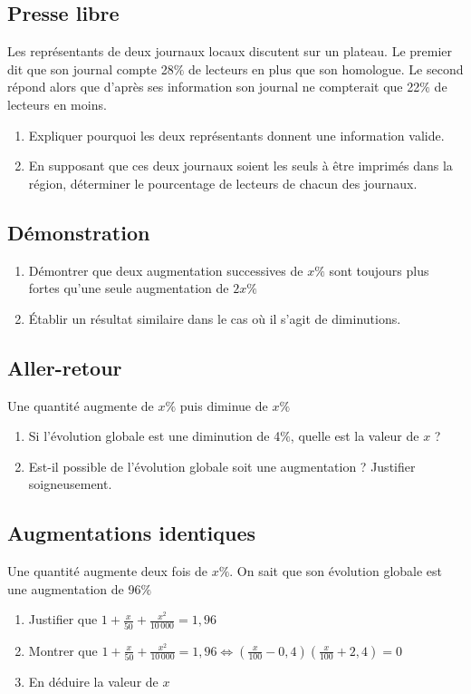 \documentclass[oneside,12pt]{article}          %
\begin{document}
\subsection{Presse libre}
Les représentants de deux journaux locaux discutent sur un plateau. Le premier dit que son journal compte 28$\%$ de lecteurs en plus que son homologue. Le second répond alors que d'après ses information son journal ne compterait que 22$\%$ de lecteurs en moins.
\begin{enumerate}
	\item Expliquer pourquoi les deux représentants donnent une information valide.
	\item En supposant que ces deux journaux soient les seuls à être imprimés dans la région, déterminer le pourcentage de lecteurs de chacun des journaux.
\end{enumerate}



\subsection{Démonstration}
\begin{enumerate}
	\item Démontrer que deux augmentation successives de $x\%$ sont toujours plus fortes qu'une seule augmentation de $2x\%$
	\item Établir un résultat similaire dans le cas où il s'agit de diminutions.
\end{enumerate}


\subsection{Aller-retour}
Une quantité augmente de $x\%$ puis diminue de $x\%$
\begin{enumerate}
    \item Si l'évolution globale est une diminution de 4$\%$, quelle est la valeur de $x$ ?
    \item Est-il possible de l'évolution globale soit une augmentation ? Justifier soigneusement.
\end{enumerate}



\subsection{Augmentations identiques}
Une quantité augmente deux fois de $x\%$. On sait que son évolution globale est une augmentation de 96$\%$
\begin{enumerate}
    \item Justifier que $1+\frac{x}{50}+\frac{x^2}{10\,000}=1,96$
    \item Montrer que $1+\frac{x}{50}+\frac{x^2}{10\,000}=1,96 \Longleftrightarrow \left(\frac{x}{100}-0,4\right)\left(\frac{x}{100}+2,4\right)=0$
    \item En déduire la valeur de $x$
\end{enumerate}
\end{document}
